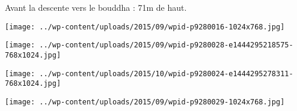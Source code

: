 \pagebreak
 Avant la descente vers le bouddha : 71m de haut. 
\begin{center} \texttt{[image: ../wp-content/uploads/2015/09/wpid-p9280016-1024x768.jpg]} \end{center}
\begin{center} \texttt{[image: ../wp-content/uploads/2015/09/wpid-p9280028-e1444295218575-768x1024.jpg]} \end{center} 
\begin{center} \texttt{[image: ../wp-content/uploads/2015/10/wpid-p9280024-e1444295278311-768x1024.jpg]} \end{center}
\begin{center} \texttt{[image: ../wp-content/uploads/2015/09/wpid-p9280029-1024x768.jpg]} \end{center}